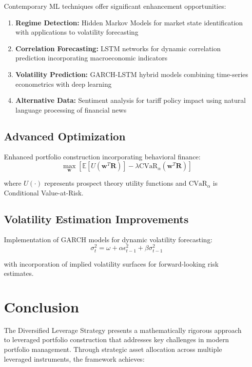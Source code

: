 \documentclass[onecolumn,11pt]{IEEEtran}
\begin{document}
Contemporary ML techniques offer significant enhancement opportunities:
\begin{enumerate}
    \item \textbf{Regime Detection:} Hidden Markov Models for market state identification with applications to volatility forecasting
    \item \textbf{Correlation Forecasting:} LSTM networks for dynamic correlation prediction incorporating macroeconomic indicators
    \item \textbf{Volatility Prediction:} GARCH-LSTM hybrid models combining time-series econometrics with deep learning
    \item \textbf{Alternative Data:} Sentiment analysis for tariff policy impact using natural language processing of financial news
\end{enumerate}

\subsection{Advanced Optimization}

Enhanced portfolio construction incorporating behavioral finance:
\begin{equation}
\max_{\mathbf{w}} \left[ \mathbb{E}[U(\mathbf{w}^T \mathbf{R})] - \lambda \text{CVaR}_\alpha(\mathbf{w}^T \mathbf{R}) \right]
\end{equation}

where $U(\cdot)$ represents prospect theory utility functions and $\text{CVaR}_\alpha$ is Conditional Value-at-Risk.

\subsection{Volatility Estimation Improvements}

Implementation of GARCH models for dynamic volatility forecasting:
\begin{equation}
\sigma_t^2 = \omega + \alpha \epsilon_{t-1}^2 + \beta \sigma_{t-1}^2
\end{equation}

with incorporation of implied volatility surfaces for forward-looking risk estimates.

\section{Conclusion}

The Diversified Leverage Strategy presents a mathematically rigorous approach to leveraged portfolio construction that addresses key challenges in modern portfolio management. Through strategic asset allocation across multiple leveraged instruments, the framework achieves:
\end{document}
